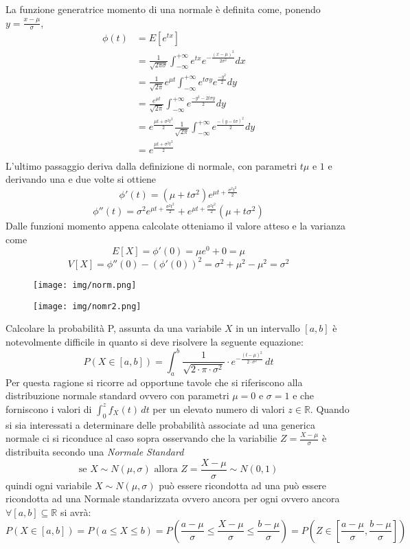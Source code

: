 \documentclass[a4paper,12pt, oneside]{book}
\newcommand{\numberset}{\mathbb}
\newcommand{\R}{\numberset{R}}
\begin{document}
La funzione generatrice momento di una normale è definita come, ponendo $y = \frac{x - \mu}{\sigma}$,
\[ \begin{split}
    \phi(t) & = E[e^{tx}] \\
            & = \frac{1}{\sqrt{2 \pi \sigma}} \int _{-\infty}^{+\infty} e^{tx} e^{-\frac{(x - \mu)^2}{2\sigma^2}} dx \\
            & = \frac{1}{\sqrt{2 \pi}} e^{\mu t} \int _{-\infty}^{+\infty} e^{t \sigma y} e^{\frac{-y^2}{2}} dy \\ 
            & = \frac{e^{\mu t}}{\sqrt{2 \pi}} \int _{-\infty}^{+\infty} e^{\frac{-y^2 - 2t \sigma y}{2}} dy \\
            & = e^{\frac{\mu t + \sigma^2 t^2}{2}} \frac{1}{\sqrt{2\pi}} \int _{-\infty}^{+\infty} e^{\frac{-(y -t\sigma)^2}{2}} dy\\
            & = e^{\frac{\mu t + \sigma^2 t^2}{2}}\\
    \end{split} \]
L'ultimo passaggio deriva dalla definizione di normale, con parametri $t\mu$ e $1$ 
e derivando una e due volte si ottiene 
\[ \phi'(t) = (\mu + t\sigma^2) e^{\mu t + \frac{\sigma^2t^2}{2}} \]
\[ \phi''(t) = \sigma^2 e^{\mu t + \frac{\sigma^2 t^2}{2}} + e^{\mu t + \frac{\sigma^2 t^2}{2}} (\mu + t\sigma^2) \]
Dalle funzioni momento appena calcolate otteniamo il valore atteso e la varianza come
\[E[X] = \phi'(0) = \mu e^0 + 0 = \mu \]
\[V[X] = \phi''(0) - (\phi'(0))^2 = \sigma^2 + \mu^2 - \mu^2 = \sigma^2 \]

\begin{figure}
    \texttt{[image: img/norm.png]}
\end{figure}
\begin{figure}
    \texttt{[image: img/nomr2.png]}
\end{figure}
Calcolare la probabilità P, assunta da una variabile $X$ in un intervallo $[a, b]$ è notevolmente difficile in
quanto si deve risolvere la seguente equazione:
\[P(X \in [a,b]) = \int_a^b \frac{1}{\sqrt{2\cdot \pi\cdot \sigma^2}}\cdot e^{-\frac{(t-\mu)^2}{2\cdot \sigma^2}}\,dt\]
Per questa ragione si ricorre ad opportune tavole che si riferiscono alla distribuzione normale standard 
ovvero con parametri $\mu = 0$ e $\sigma = 1$ e che forniscono i valori di $\int_0^z f_X(t)\,dt$ 
per un elevato numero di valori $z \in \R$.\newline
Quando si sia interessati a determinare delle probabilità associate ad una generica normale ci si riconduce al
caso sopra osservando che la variabilie $Z = \frac{X - \mu}{\sigma}$ è distribuita secondo una \emph{Normale Standard}
\[\mbox{se } X \sim N(\mu, \sigma) \mbox{ allora } Z = \frac{X - \mu}{\sigma} \sim N(0,1)\]
quindi ogni variabile $X \sim N(\mu, \sigma)$ può essere ricondotta ad una può essere ricondotta ad una Normale
standarizzata ovvero ancora per ogni ovvero ancora $\forall [a,b] \subseteq \R$ si avrà:
\[P(X \in [a,b]) = P(a \leq X \leq b) =P \left(\frac{a - \mu}{\sigma} \leq \frac{X-\mu}{\sigma} \leq 
                   \frac{b-\mu}{\sigma}\right) = P \left(Z \in \left[\frac{a-\mu}{\sigma},\frac{b-\mu}{\sigma}\right]\right)\]
\end{document}
